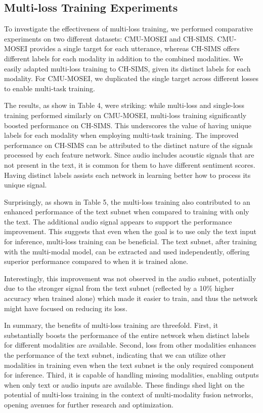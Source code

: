 \documentclass[11pt]{article}
\begin{document}
\subsection{Multi-loss Training Experiments}
To investigate the effectiveness of multi-loss training, we performed comparative experiments on two different datasets: CMU-MOSEI and CH-SIMS. CMU-MOSEI provides a single target for each utterance, whereas CH-SIMS offers different labels for each modality in addition to the combined modalities.
We easily adapted multi-loss training to CH-SIMS, given its distinct labels for each modality. For CMU-MOSEI, we duplicated the single target across different losses to enable multi-task training. 

The results, as show in Table 4, were striking: while multi-loss and single-loss training performed similarly on CMU-MOSEI, multi-loss training significantly boosted performance on CH-SIMS. This underscores the value of having unique labels for each modality when employing multi-task training. The improved performance on CH-SIMS can be attributed to the distinct nature of the signals processed by each feature network. Since audio includes acoustic signals that are not present in the text, it is common for them to have different sentiment scores. Having distinct labels assists each network in learning better how to process its unique signal.

Surprisingly, as shown in Table 5, the multi-loss training also contributed to an enhanced performance of the text subnet when compared to training with only the text. The additional audio signal appears to support the performance improvement. This suggests that even when the goal is to use only the text input for inference, multi-loss training can be beneficial. The text subnet, after training with the multi-modal model, can be extracted and used independently, offering superior performance compared to when it is trained alone.

Interestingly, this improvement was not observed in the audio subnet, potentially due to the stronger signal from the text subnet (reflected by a 10\% higher accuracy when trained alone) which made it easier to train, and thus the network might have focused on reducing its loss.

In summary, the benefits of multi-loss training are threefold. First, it substantially boosts the performance of the entire network when distinct labels for different modalities are available. Second, loss from other modalities enhances the performance of the text subnet, indicating that we can utilize other modalities in training even when the text subnet is the only required component for inference. Third, it is capable of handling missing modalities, enabling outputs when only text or audio inputs are available. These findings shed light on the potential of multi-loss training in the context of multi-modality fusion networks, opening avenues for further research and optimization.
\end{document}
